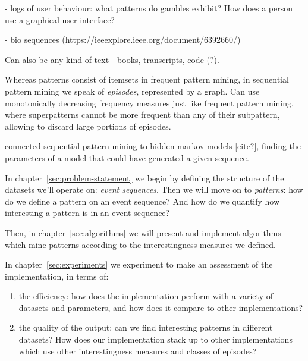 - logs of user behaviour: what patterns do gambles exhibit? How does a person use a graphical user interface?

- bio sequences (https://ieeexplore.ieee.org/document/6392660/)

Can also be any kind of text---books, transcripts, code (?).

Whereas patterns consist of itemsets in frequent pattern mining, in sequential pattern mining we speak of \emph{episodes}, represented by a graph. Can use monotonically decreasing frequency measures just like frequent pattern mining, where superpatterns cannot be more frequent than any of their subpattern, allowing to discard large portions of episodes.

\cite{laxman2005discovering} connected sequential pattern mining to hidden markov models [cite?], finding the parameters of a model that could have generated a given sequence.


In chapter~\ref{sec:problem-statement} we begin by defining the structure of the datasets we'll operate on: \emph{event sequences}. Then we will move on to \emph{patterns}: how do we define a pattern on an event sequence?
And how do we quantify how interesting a pattern is in an event sequence?

Then, in chapter~\ref{sec:algorithms} we will present and implement algorithms which mine patterns according to the interestingness measures we defined.

In chapter~\ref{sec:experiments} we experiment to make an assessment of the implementation, in terms of:

\begin{enumerate}
\item the efficiency: how does the implementation perform with a variety of datasets and parameters, and how does it compare to other implementations?
\item the quality of the output: can we find interesting patterns in different datasets? How does our implementation stack up to other implementations which use other interestingness measures and classes of episodes?
\end{enumerate}
